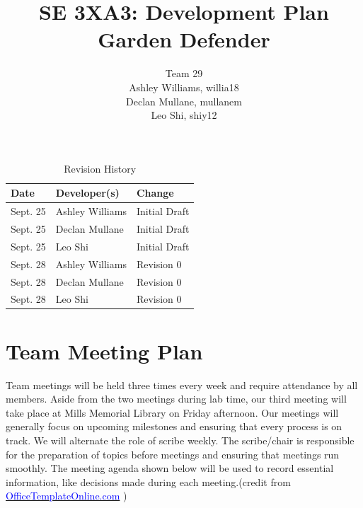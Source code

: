 \documentclass{article}
\title{SE 3XA3: Development Plan\\Garden Defender}
\author{Team 29
		\\ Ashley Williams, willia18
		\\ Declan Mullane, mullanem
		\\ Leo Shi, shiy12
}
\date{}
\begin{document}
\begin{table}[hp]
\caption{Revision History} \label{TblRevisionHistory}
\begin{tabularx}{\textwidth}{llX}
\toprule
\textbf{Date} & \textbf{Developer(s)} & \textbf{Change}\\
\midrule
Sept. 25 & Ashley Williams & Initial Draft\\
Sept. 25 & Declan Mullane & Initial Draft\\
Sept. 25 & Leo Shi & Initial Draft\\
Sept. 28 & Ashley Williams & Revision 0\\
Sept. 28 & Declan Mullane & Revision 0\\
Sept. 28 & Leo Shi & Revision 0\\
\bottomrule
\end{tabularx}
\end{table}

\newpage

\maketitle

\section{Team Meeting Plan}
Team meetings will be held three times every week and require attendance by all members. Aside from the two meetings during lab time, our third meeting will take place at Mills Memorial Library on Friday afternoon. Our meetings will generally focus on upcoming milestones and ensuring that every process is on track. We will alternate the role of scribe weekly.  The scribe/chair is responsible for the preparation of topics before meetings and ensuring that meetings run smoothly. The meeting agenda shown below will be used to record essential information, like decisions made during each meeting.(credit from \href{https://officetemplatesonline.com/download/download-formal-meeting-agenda-template/}{\textcolor{blue} {OfficeTemplateOnline.com}} )
\end{document}
